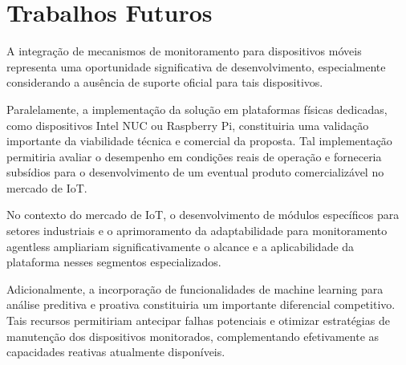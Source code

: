 \section{Trabalhos Futuros}
\label{section:TrabalhosFuturos}
{\color{red}

A integração de mecanismos de monitoramento para dispositivos móveis representa uma oportunidade significativa de desenvolvimento, especialmente considerando a ausência de suporte oficial para tais dispositivos.

Paralelamente, a implementação da solução em plataformas físicas dedicadas, como dispositivos Intel NUC ou Raspberry Pi, constituiria uma validação importante da viabilidade técnica e comercial da proposta. Tal implementação permitiria avaliar o desempenho em condições reais de operação e forneceria subsídios para o desenvolvimento de um eventual produto comercializável no mercado de IoT.

No contexto do mercado de IoT, o desenvolvimento de módulos específicos para setores industriais e o aprimoramento da adaptabilidade para monitoramento agentless ampliariam significativamente o alcance e a aplicabilidade da plataforma nesses segmentos especializados.

Adicionalmente, a incorporação de funcionalidades de machine learning para análise preditiva e proativa constituiria um importante diferencial competitivo. Tais recursos permitiriam antecipar falhas potenciais e otimizar estratégias de manutenção dos dispositivos monitorados, complementando efetivamente as capacidades reativas atualmente disponíveis.}

